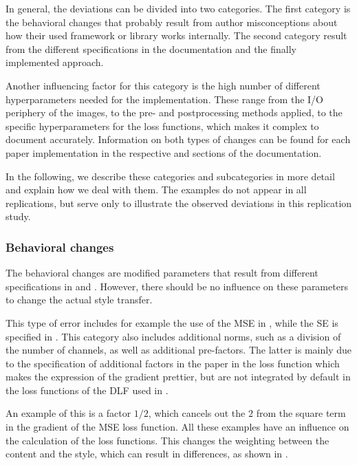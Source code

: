 In general, the deviations can be divided into two categories. The first category is the behavioral changes that probably result from author misconceptions about how their used framework or library works internally. The second category  result from the different specifications in the documentation and the finally implemented approach. 

Another influencing factor for this category is the high number of different hyperparameters needed for the implementation. These range from the I/O periphery of the images, to the pre- and postprocessing methods applied, to the specific hyperparameters for the loss functions, which makes it complex to document accurately. Information on both types of changes can be found for each paper implementation in the respective  and  sections of the documentation. 

In the following, we describe these categories and subcategories in more detail and explain how we deal with them. The examples do not appear in all replications, but serve only to illustrate the observed deviations in this replication study.

\subsubsection{Behavioral changes}
The behavioral changes are modified parameters that result from different specifications in \paper{} and \implementation{}. However, there should be no influence on these parameters to change the actual style transfer.

This type of error includes for example the use of the \gls{MSE} in \implementation{}, while the \gls{SE} is specified in \paper{}. This category also includes additional norms, such as a division of the number of channels, as well as additional pre-factors. The latter is mainly due to the specification of additional factors in the paper in the loss function which makes the expression of the gradient prettier, but are not integrated by default in the loss functions of the \gls{DLF} used in \implementation{}. 

An example of this is a factor $1/2$, which cancels out the $2$ from the square term in the gradient of the \gls{MSE} loss function. All these examples have an influence on the calculation of the loss functions. This changes the weighting between the content and the style, which can result in differences, as shown in . 


